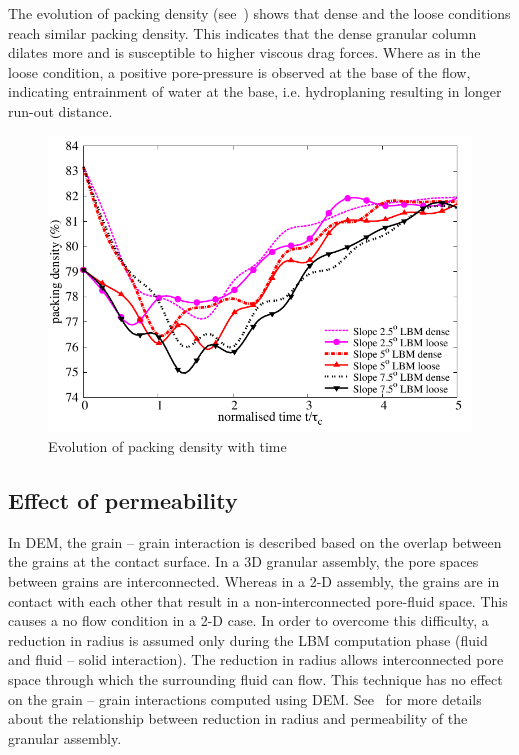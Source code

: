 \documentclass[12pt,a4paper,twocolumn,fleqn]{NARMS}
\begin{document}
The evolution of packing density (see~) shows that dense and the loose conditions reach similar packing density. This indicates that the dense granular column dilates more and is susceptible to higher viscous drag forces. Where as in the loose condition, a positive pore-pressure is observed at the base of the flow, indicating entrainment of water at the base, i.e. hydroplaning resulting in longer run-out distance.

\begin{figure}
\centering
\includegraphics[width=0.97\columnwidth]{figs/Voronoi.pdf}
\caption{Evolution of packing density with time}
\label{fig:voro}
\end{figure}


\subsection{Effect of permeability}

In DEM, the grain -- grain interaction is described based on the overlap between the grains at the contact surface. In a 3D granular assembly, the pore spaces between grains are interconnected. Whereas in a 2-D assembly, the grains are in contact with each other that result in a non-interconnected pore-fluid space. This causes a no flow condition in a 2-D case. In order to overcome this difficulty, a reduction in radius is assumed only during the LBM computation phase (fluid and fluid -- solid interaction). The reduction in radius allows interconnected pore space through which the surrounding fluid can flow. This technique has no effect on the grain -- grain interactions computed using DEM. See~ for more details about the relationship between reduction in radius and permeability of the granular assembly.
\end{document}
